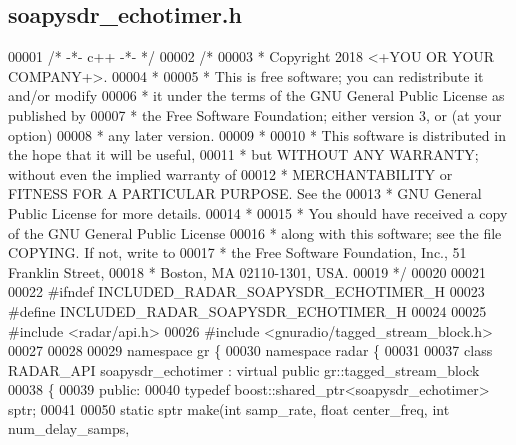 \subsection{soapysdr\+\_\+echotimer.\+h}
\label{soapysdr__echotimer_8h_source}

\begin{DoxyCode}
00001 \textcolor{comment}{/* -*- c++ -*- */}
00002 \textcolor{comment}{/*}
00003 \textcolor{comment}{ * Copyright 2018 <+YOU OR YOUR COMPANY+>.}
00004 \textcolor{comment}{ *}
00005 \textcolor{comment}{ * This is free software; you can redistribute it and/or modify}
00006 \textcolor{comment}{ * it under the terms of the GNU General Public License as published by}
00007 \textcolor{comment}{ * the Free Software Foundation; either version 3, or (at your option)}
00008 \textcolor{comment}{ * any later version.}
00009 \textcolor{comment}{ *}
00010 \textcolor{comment}{ * This software is distributed in the hope that it will be useful,}
00011 \textcolor{comment}{ * but WITHOUT ANY WARRANTY; without even the implied warranty of}
00012 \textcolor{comment}{ * MERCHANTABILITY or FITNESS FOR A PARTICULAR PURPOSE.  See the}
00013 \textcolor{comment}{ * GNU General Public License for more details.}
00014 \textcolor{comment}{ *}
00015 \textcolor{comment}{ * You should have received a copy of the GNU General Public License}
00016 \textcolor{comment}{ * along with this software; see the file COPYING.  If not, write to}
00017 \textcolor{comment}{ * the Free Software Foundation, Inc., 51 Franklin Street,}
00018 \textcolor{comment}{ * Boston, MA 02110-1301, USA.}
00019 \textcolor{comment}{ */}
00020 
00021 
00022 \textcolor{preprocessor}{#ifndef INCLUDED\_RADAR\_SOAPYSDR\_ECHOTIMER\_H}
00023 \textcolor{preprocessor}{#define INCLUDED\_RADAR\_SOAPYSDR\_ECHOTIMER\_H}
00024 
00025 \textcolor{preprocessor}{#include <radar/api.h>}
00026 \textcolor{preprocessor}{#include <gnuradio/tagged\_stream\_block.h>}
00027 
00028 
00029 \textcolor{keyword}{namespace }gr \{
00030   \textcolor{keyword}{namespace }radar \{
00031 
00037     \textcolor{keyword}{class }RADAR_API soapysdr_echotimer : \textcolor{keyword}{virtual} \textcolor{keyword}{public} gr::tagged\_stream\_block
00038     \{
00039      \textcolor{keyword}{public}:
00040       \textcolor{keyword}{typedef} boost::shared\_ptr<soapysdr\_echotimer> sptr;
00041 
00050       \textcolor{keyword}{static} sptr make(\textcolor{keywordtype}{int} samp_rate, \textcolor{keywordtype}{float} center_freq, \textcolor{keywordtype}{int} num\_delay\_samps,

\end{DoxyCode}
